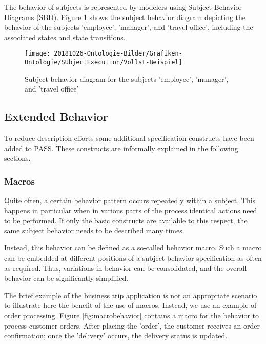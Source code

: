 The behavior of subjects is represented by modelers using Subject Behavior Diagrams (SBD). Figure \ref{fig:vollst-beispiel} shows the subject behavior diagram depicting the behavior of the subjects 'employee', 'manager', and 'travel office', including the associated states and state transitions. 

\begin{landscape}
	\begin{figure}[htbp]
		\centering
		\texttt{[image: 20181026-Ontologie-Bilder/Grafiken-Ontologie/SUbjectExecution/Vollst-Beispiel]}
		\caption[Subject behavior diagram for the subjects 'employee', 'manager', and 'travel office']{Subject behavior diagram for the subjects 'employee', 'manager', and 'travel office'}
		\label{fig:vollst-beispiel}
	\end{figure}
\end{landscape}

\subsection{Extended Behavior}

To reduce description efforts some additional specification constructs have been added to PASS. These constructs are informally explained in the following sections. 

\subsubsection{Macros}

Quite often, a certain behavior pattern occurs repeatedly within a subject. This happens in particular when in various parts of the process identical actions need to be performed. If only the basic constructs are available to this respect, the same subject behavior needs to be described many times.

Instead, this behavior can be defined as a so-called behavior macro. Such a macro can be embedded at different positions of a subject behavior specification as often as required. Thus, variations in behavior can be consolidated, and the overall behavior can be significantly simplified.

The brief example of the business trip application is not an appropriate scenario to illustrate here the benefit of the use of macros. Instead, we use an example of order processing. Figure \ref{fig:macrobehavior} contains a macro for the behavior to process customer orders. After placing the 'order', the customer receives an order confirmation; once the 'delivery' occurs, the delivery status is updated.

